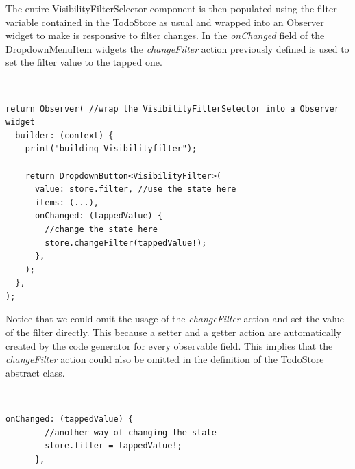 The entire VisibilityFilterSelector component is then populated using the filter  variable contained in the TodoStore as usual and wrapped into an Observer widget to make is responsive to filter changes. In the \textit{onChanged} field of the DropdownMenuItem widgets the \textit{changeFilter} action previously defined is used to
set the filter value to the tapped one.
\begin{code}
\mbox{}\\
 \mbox{}
		\label{code:2.133}
\begin{verbatim}
return Observer( //wrap the VisibilityFilterSelector into a Observer widget
  builder: (context) {
    print("building Visibilityfilter");

    return DropdownButton<VisibilityFilter>(
      value: store.filter, //use the state here
      items: (...),
      onChanged: (tappedValue) {
        //change the state here
        store.changeFilter(tappedValue!);
      },
    );
  },
);
\end{verbatim}
\mbox{}
\end{code}

Notice that we could omit the usage of the \textit{changeFilter} action and set the value of the filter directly. This because a setter and a getter action are automatically created by the code generator for every observable field. This implies that the \textit{changeFilter} action could also be omitted in the definition of the TodoStore abstract class.
\begin{code}
\mbox{}\\
 \mbox{}
		\label{code:2.134}
\begin{verbatim}
onChanged: (tappedValue) {
        //another way of changing the state
        store.filter = tappedValue!; 
      },
\end{verbatim}
\mbox{}
\end{code}

